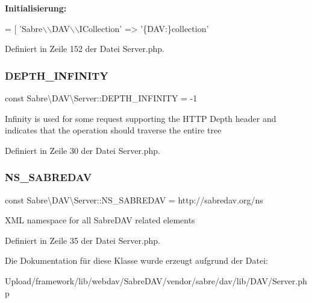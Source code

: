{\bfseries Initialisierung\+:}
\begin{DoxyCode}
= [
        \textcolor{stringliteral}{'Sabre\(\backslash\)\(\backslash\)DAV\(\backslash\)\(\backslash\)ICollection'} => \textcolor{stringliteral}{'\{DAV:\}collection'}
\end{DoxyCode}


Definiert in Zeile 152 der Datei Server.\+php.

\mbox{\label{class_sabre_1_1_d_a_v_1_1_server_a038019ed8da25e71c226240edf93d415}} 
\subsubsection{\texorpdfstring{D\+E\+P\+T\+H\+\_\+\+I\+N\+F\+I\+N\+I\+TY}{DEPTH\_INFINITY}}
{\footnotesize\ttfamily const Sabre\textbackslash{}\+D\+A\+V\textbackslash{}\+Server\+::\+D\+E\+P\+T\+H\+\_\+\+I\+N\+F\+I\+N\+I\+TY = -\/1}

Infinity is used for some request supporting the H\+T\+TP Depth header and indicates that the operation should traverse the entire tree 

Definiert in Zeile 30 der Datei Server.\+php.

\mbox{\label{class_sabre_1_1_d_a_v_1_1_server_a866ccf12b4b09dedd1f6c59c0151b1e2}} 
\subsubsection{\texorpdfstring{N\+S\+\_\+\+S\+A\+B\+R\+E\+D\+AV}{NS\_SABREDAV}}
{\footnotesize\ttfamily const Sabre\textbackslash{}\+D\+A\+V\textbackslash{}\+Server\+::\+N\+S\+\_\+\+S\+A\+B\+R\+E\+D\+AV = \textquotesingle{}http\+://sabredav.\+org/ns\textquotesingle{}}

X\+ML namespace for all Sabre\+D\+AV related elements 

Definiert in Zeile 35 der Datei Server.\+php.



Die Dokumentation für diese Klasse wurde erzeugt aufgrund der Datei\+:\begin{DoxyCompactItemize}
\item 
Upload/framework/lib/webdav/\+Sabre\+D\+A\+V/vendor/sabre/dav/lib/\+D\+A\+V/Server.\+php\end{DoxyCompactItemize}
